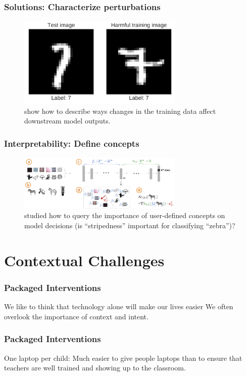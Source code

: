 \documentclass[10pt,mathserif]{beamer}
\begin{document}
\begin{frame}
  \frametitle{Solutions: Characterize perturbations}
\begin{figure}[ht]
  \centering
  \includegraphics[width=0.7\textwidth]{figures/influence}
  \caption{\citep{koh2017understanding} show how to describe ways changes in the
    training data affect downstream model outputs. \label{fig:label} }
\end{figure}
\end{frame}

\begin{frame}
  \frametitle{Interpretability: Define concepts}
  \begin{figure}[ht]
    \centering
    \includegraphics[width=0.7\textwidth]{figures/concepts}
    \caption{\citep{kim2017interpretability} studied how to query the importance
      of user-defined concepts on model decisions (is ``stripedness'' important
      for classifying ``zebra'')?}
  \end{figure}
\end{frame}

\section{Contextual Challenges}
\label{sec:label}

\begin{frame}
  \frametitle{Packaged Interventions}
  We like to think that technology alone will make our lives easier
  We often overlook the importance of context and intent.
\end{frame}

\begin{frame}
  \frametitle{Packaged Interventions}
  One laptop per child: Much easier to give people laptops than to ensure that
  teachers are well trained and showing up to the classroom.
\end{frame}
\end{document}
